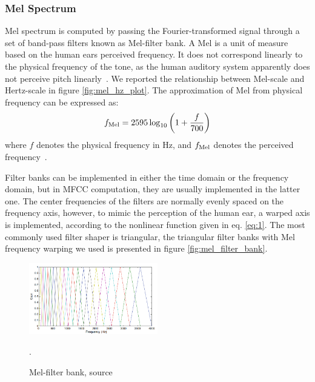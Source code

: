 \subsubsection{Mel Spectrum}
Mel spectrum is computed by passing the Fourier-transformed signal through a set of band-pass filters known as Mel-filter bank. A Mel is a unit of measure based on the human ears perceived frequency. It does not correspond linearly to the physical frequency of the tone, as the human auditory system apparently does not perceive pitch linearly~\cite{rao:spectral}. We reported the relationship between Mel-scale and Hertz-scale in figure \vref{fig:mel_hz_plot}. The approximation of Mel from physical frequency can be expressed as:
\begin{equation}\label{eq:1}
	f_{\operatorname{Mel}}=2595 \log _{10}\left(1+\frac{f}{700}\right)
\end{equation}
where $f$ denotes the physical frequency in Hz, and $f_{\operatorname{Mel}}$ denotes the perceived frequency~\cite{deller:dt_processing}.

Filter banks can be implemented in either the time domain or the frequency domain, but in MFCC computation, they are usually implemented in the latter one. The center frequencies of the filters are normally evenly spaced on the frequency axis, however, to mimic the perception of the human ear, a warped axis is implemented, according to the nonlinear function given in eq. \vref{eq:1}. The most commonly used filter shaper is triangular, the triangular filter banks with Mel frequency warping we used is presented in figure \vref{fig:mel_filter_bank}.
\begin{figure}
  \includegraphics[width=0.5\textwidth]{images/mel_filters.png}
  \caption{Mel-filter bank, source~\cite{rao:spectral}}.
  \label{fig:mel_filter_bank}
\end{figure}

